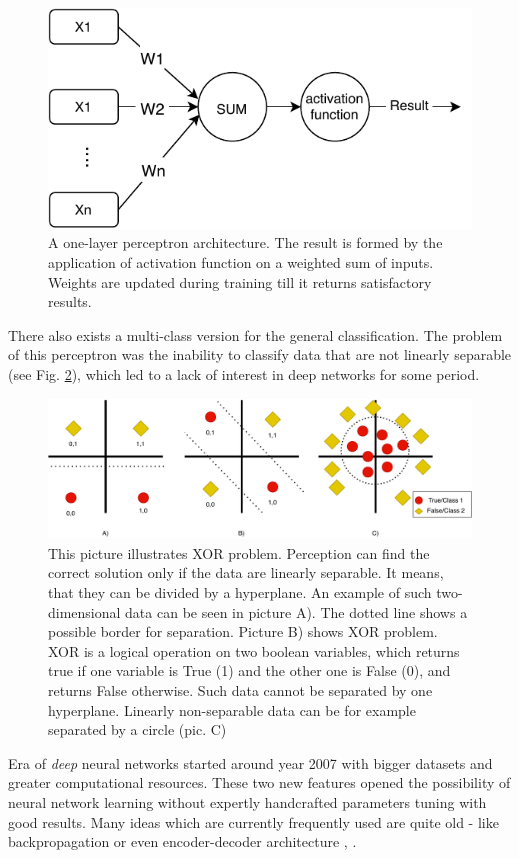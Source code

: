 \begin{figure}[h]
\centering
\includegraphics[width=0.8\columnwidth]{../img/perceptron}
\caption{A one-layer perceptron architecture. The result is formed by the application of activation function on a weighted sum of inputs. Weights are updated during training till it returns satisfactory results. }
\label{pic:perceptron}
\end{figure}
There also exists a multi-class version for the general classification. The problem of this perceptron was the inability to classify data that are not linearly separable \citep{Minsky2017} (see Fig. \ref{pic:xor}), which led to a lack of interest in deep networks for some period.
\begin{figure}[h]
\centering
\includegraphics[width=0.6\columnwidth]{../img/xor}
\caption{This picture illustrates XOR problem. Perception can find the correct solution only if the data are linearly separable. It means, that they can be divided by a hyperplane. An example of such two-dimensional data can be seen in picture A). The dotted line shows a possible border for separation. Picture B) shows XOR problem. XOR is a logical operation on two boolean variables, which returns true if one variable is True (1) and the other one is False (0), and returns False otherwise. Such data cannot be separated by one hyperplane. Linearly non-separable data can be for example separated by a circle (pic. C)}
\label{pic:xor}
\end{figure}

Era of \textit{deep} neural networks started around year 2007 %
with bigger datasets and greater computational resources. These two new features opened the possibility of neural network learning without expertly handcrafted parameters tuning with good results.
Many ideas which are currently frequently used are quite old - like backpropagation \citep{Rumelhart} or even encoder-decoder architecture \citep{Allen19}, \citep{Forcada1997}.


